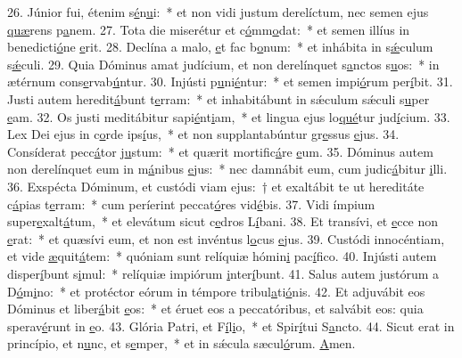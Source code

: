 26. Júnior fui, étenim s\uline{é}n\uline{u}i:~* et non vidi justum derelíctum, nec semen ejus \uline{quæ}rens p\uline{a}nem.
27. Tota die miserétur et c\uline{ó}mm\uline{o}dat:~* et semen illíus in benedicti\uline{ó}ne \uline{e}rit.
28. Declína a malo, \uline{e}t fac b\uline{o}num:~* et inhábita in s\uline{ǽ}culum s\uline{ǽ}culi.
29. Quia Dóminus amat judícium, et non derelínquet s\uline{a}nctos s\uline{u}os:~* in ætérnum cons\uline{e}rvab\uline{ú}ntur.
30. Injústi p\uline{u}ni\uline{é}ntur:~* et semen impi\uline{ó}rum per\uline{í}bit.
31. Justi autem heredit\uline{á}bunt t\uline{e}rram:~* et inhabitábunt in sǽculum sǽculi s\uline{u}per \uline{e}am.
32. Os justi meditábitur sapi\uline{é}nt\uline{i}am,~* et lingua ejus lo\uline{qué}tur jud\uline{í}cium.
33. Lex Dei ejus in c\uline{o}rde ips\uline{í}us,~* et non supplantabúntur gr\uline{e}ssus \uline{e}jus.
34. Consíderat pecc\uline{á}tor j\uline{u}stum:~* et quærit mortific\uline{á}re \uline{e}um.
35. Dóminus autem non derelínquet eum in m\uline{á}nibus \uline{e}jus:~* nec damnábit eum, cum judic\uline{á}bitur \uline{i}lli.
36. Exspécta Dóminum, et custódi viam ejus:~† et exaltábit te ut hereditáte c\uline{á}pias t\uline{e}rram:~* cum períerint peccat\uline{ó}res vid\uline{é}bis.
37. Vidi ímpium super\uline{e}xalt\uline{á}tum,~* et elevátum sicut c\uline{e}dros L\uline{í}bani.
38. Et transívi, et \uline{e}cce non \uline{e}rat:~* et quæsívi eum, et non est invéntus l\uline{o}cus \uline{e}jus.
39. Custódi innocéntiam, et vide \uline{æ}quit\uline{á}tem:~* quóniam sunt relíquiæ hómin\uline{i} pac\uline{í}fico.
40. Injústi autem disper\uline{í}bunt s\uline{i}mul:~* relíquiæ impiórum \uline{i}nter\uline{í}bunt.
41. Salus autem justórum a D\uline{ó}m\uline{i}no:~* et protéctor eórum in témpore tribul\uline{a}ti\uline{ó}nis.
42. Et adjuvábit eos Dóminus et liber\uline{á}bit \uline{e}os:~* et éruet eos a peccatóribus, et salvábit eos: quia sperav\uline{é}runt in \uline{e}o.
43. Glória Patri, et F\uline{í}l\uline{i}o,~* et Spir\uline{í}tui S\uline{a}ncto.
44. Sicut erat in princípio, et n\uline{u}nc, et s\uline{e}mper,~* et in sǽcula sæcul\uline{ó}rum. \uline{A}men.

